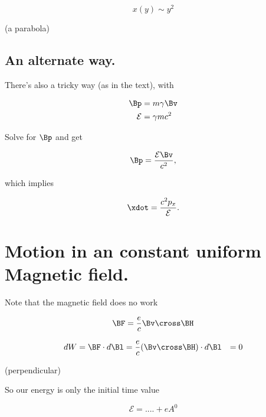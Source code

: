 \begin{equation}\label{eqn:relativisticElectrodynamicsT3:480}
x(y) \sim y^2
\end{equation}

(a parabola)

\subsection{An alternate way.}

There's also a tricky way (as in the text), with 

\begin{align}\label{eqn:relativisticElectrodynamicsT3:160}
\Bp &= m \gamma \Bv  \\
\mathcal{E} &= \gamma m c^2 
\end{align}

Solve for $\Bp$ and get

\begin{equation}\label{eqn:relativisticElectrodynamicsT3:180}
\Bp = \frac{\mathcal{E} \Bv}{c^2},
\end{equation}

which implies

\begin{equation}\label{eqn:relativisticElectrodynamicsT3:200}
\xdot = \frac{c^2 p_x}{\mathcal{E}}.
\end{equation}

\section{Motion in an constant uniform Magnetic field.}

Note that the magnetic field does no work

\begin{equation}\label{eqn:relativisticElectrodynamicsT3:500}
\BF = \frac{e}{c} \Bv \cross \BH
\end{equation}

\begin{align*}
dW = 
\BF \cdot d\Bl
&=
\frac{e}{c} (\Bv \cross \BH) \cdot d\Bl
&= 0
\end{align*}

(perpendicular)

So our energy is only the initial time value

\begin{equation}\label{eqn:relativisticElectrodynamicsT3:520}
\mathcal{E} = .... + e A^0
\end{equation}

